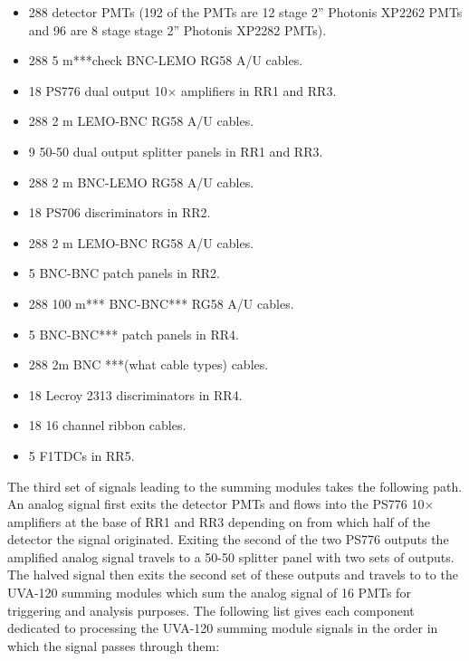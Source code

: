 \documentclass[oneside]{book}   %
\begin{document}
\begin{itemize}\itemsep6pt \parskip0pt 
	\item 288 detector PMTs (192 of the PMTs are 12 stage 2'' Photonis XP2262 PMTs and 96 are 8 stage stage 2'' Photonis XP2282 PMTs).
	\item 288 5 m***check BNC-LEMO RG58 A/U cables. 
	\item 18 PS776 dual output 10$\times$ amplifiers in RR1 and RR3.
	\item 288 2 m LEMO-BNC RG58 A/U cables. 
	\item 9 50-50 dual output splitter panels in RR1 and RR3. 
	\item 288 2 m BNC-LEMO RG58 A/U cables.
	\item 18 PS706 discriminators in RR2.
	\item 288 2 m LEMO-BNC RG58 A/U cables.
	\item 5 BNC-BNC patch panels in RR2.
	\item 288 100 m*** BNC-BNC*** RG58 A/U cables. 
	\item 5 BNC-BNC*** patch panels in RR4. 
	\item 288 2m BNC ***(what cable types) cables.
	\item 18 Lecroy 2313 discriminators in RR4.
	\item 18 16 channel ribbon cables.
	\item 5 F1TDCs in RR5. 
\end{itemize}

The third set of signals leading to the summing modules takes the following path. An analog signal first exits the detector PMTs and flows into the PS776 10$\times$ amplifiers at the base of RR1 and RR3 depending on from which half of the detector the signal originated. Exiting the second of the two PS776 outputs the amplified analog signal travels to a 50-50 splitter panel with two sets of outputs. The halved signal then exits the second set of these outputs and travels to to the UVA-120 summing modules which sum the analog signal of 16 PMTs for triggering and analysis purposes. The following list gives each component dedicated to processing the UVA-120 summing module signals in the order in which the signal passes through them:\\
\end{document}
